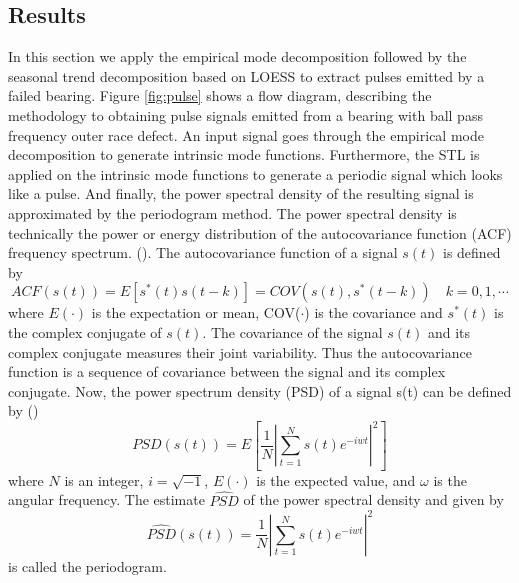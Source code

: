 \documentclass[../Main/thesis.tex]{subfiles}
\begin{document}
\subsection{Results }
In this section we apply the empirical mode decomposition followed by the seasonal trend decomposition based on LOESS to extract pulses emitted by a failed bearing.
Figure \ref{fig:pulse} shows a flow diagram, describing the methodology to obtaining pulse signals emitted from a bearing with ball pass frequency outer race defect. An input signal goes through the empirical mode decomposition to generate intrinsic mode functions. Furthermore, the STL is applied on the intrinsic mode functions to generate a periodic signal which looks like a pulse. And finally, the power spectral density of the resulting signal is approximated by the periodogram method.
\justify
The power spectral density is technically the power or energy distribution of the autocovariance function (ACF) frequency spectrum. (\cite{stoica2004}). The autocovariance function of a signal $s(t)$ is defined by 
\begin{equation}
	ACF(s(t)) = E\left[ s^{*}(t)s(t-k) \right] = COV\left(s(t), s^{*}(t-k)\right)\quad k = 0,1, \cdots
\end{equation}
where $E(\cdot)$ is the expectation or mean, COV($\cdot$) is the covariance and $s^{*}(t)$ is the complex conjugate of $s(t)$. The covariance of the signal $s(t)$ and its complex conjugate measures their joint variability. Thus the autocovariance function is a sequence of covariance between the signal and its complex conjugate. Now, the power spectrum density (PSD) of a signal s(t) can be defined by (\cite{stoica2004})
\begin{equation}\label{eq:psd}
	PSD\left(s(t)\right) = E\left[ \frac{1}{N} \left\vert \sum_{t=1}^{N} s(t)e^{-iwt}\right\vert^{2}   \right]
\end{equation}
where $N$ is an integer, $i=\sqrt{-1}$, $E(\cdot)$ is the expected value, and $\omega$ is the angular frequency. The estimate $\widehat{PSD}$ of the power spectral density and given by
\begin{equation}
		\widehat{PSD}\left(s(t)\right) =  \frac{1}{N} \left\vert \sum_{t=1}^{N} s(t)e^{-iwt}\right\vert^{2}
\end{equation}
is called the periodogram.
\end{document}
